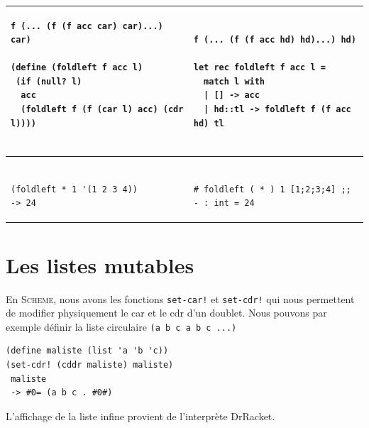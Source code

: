 \begin{footnotesize}
\begin{tabular}{l|l}
\begin{minipage}{2.8in}
\begin{Verbatim}
f (... (f (f acc car) car)...) car)

(define (foldleft f acc l)
 (if (null? l)
  acc
  (foldleft f (f (car l) acc) (cdr l))))
  
\end{Verbatim}
\end{minipage}
&
\begin{minipage}{2.8in}
\begin{Verbatim}

f (... (f (f acc hd) hd)...) hd)

let rec foldleft f acc l =
  match l with
  | [] -> acc
  | hd::tl -> foldleft f (f acc hd) tl
  
\end{Verbatim}
\end{minipage} \\ \hline
\begin{minipage}{2.8in}
\begin{Verbatim}

(foldleft * 1 '(1 2 3 4))
-> 24

\end{Verbatim}
\end{minipage}
&
\begin{minipage}{3.0in}
\begin{Verbatim}

# foldleft ( * ) 1 [1;2;3;4] ;;
- : int = 24

\end{Verbatim}
\end{minipage} 

\end{tabular}

\end{footnotesize}
\section{Les listes mutables}

En \textsc{Scheme}, nous avons les fonctions \verb+set-car!+ et \verb+set-cdr!+ qui nous permettent de modifier physiquement
 le car et le cdr d'un doublet.
Nous pouvons par exemple définir la liste circulaire \verb+(a b c a b c ...)+
\begin{Verbatim}
(define maliste (list 'a 'b 'c))
(set-cdr! (cddr maliste) maliste)
 maliste
 -> #0= (a b c . #0#)
\end{Verbatim}
L'affichage de la liste infine provient de l'interprète DrRacket.


